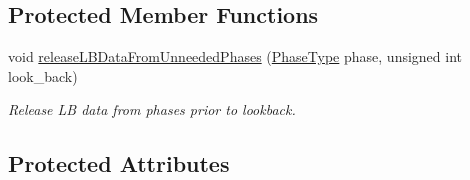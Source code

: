 \subsection*{Protected Member Functions}
\begin{DoxyCompactItemize}
\item 
void \hyperlink{structvt_1_1elm_1_1_element_l_b_data_ad74e3a2d52dc65533df25846211c9aa4}{release\+L\+B\+Data\+From\+Unneeded\+Phases} (\hyperlink{namespacevt_a46ce6733d5cdbd735d561b7b4029f6d7}{Phase\+Type} phase, unsigned int look\+\_\+back)
\begin{DoxyCompactList}\small\item\em Release LB data from phases prior to lookback. \end{DoxyCompactList}\end{DoxyCompactItemize}
\subsection*{Protected Attributes}
